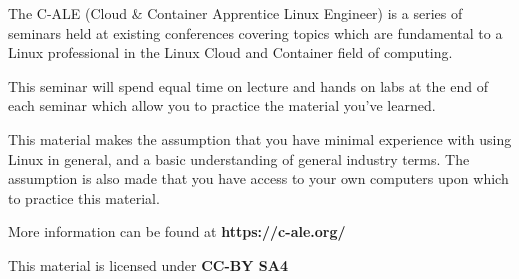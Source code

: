 \alecopyright

\par
The C-ALE (Cloud \& Container Apprentice Linux Engineer) is
a series of seminars held at existing conferences covering
topics which are fundamental to a Linux professional in
the Linux Cloud and Container field of computing.

\par
This seminar will spend equal time on lecture and hands on
labs at the end of each seminar which allow you to practice
the material you've learned.

\begin{lfbox}
   This material makes the assumption that you have minimal
   experience with using Linux in general, and a basic
   understanding of general industry terms.
   The assumption is also made that you have access to your
   own computers upon which to practice this material.
\end{lfbox}

\par
More information can be found at \textbf{https://c-ale.org/}

\par
This material is licensed under \textbf{CC-BY SA4}
